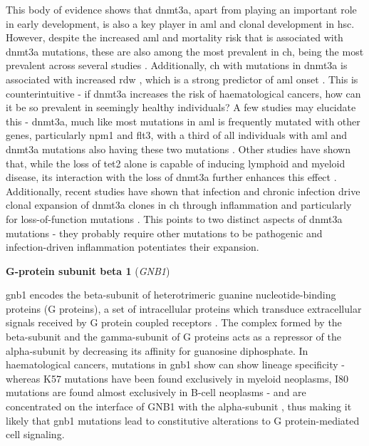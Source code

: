 This body of evidence shows that \ac{dnmt3a}, apart from playing an important role in early development, is also a key player in \ac{aml} and clonal development in \ac{hsc}. However, despite the increased \ac{aml} and mortality risk that is associated with \ac{dnmt3a} mutations, these are also among the most prevalent in \ac{ch}, being the most prevalent across several studies \cite{Jaiswal2014-rl,Genovese2014-eu,Zink2017-zi,Xie2014-np,Zehir2017-gh}. Additionally, \ac{ch} with mutations in \ac{dnmt3a} is associated with increased \ac{rdw} \cite{Dawoud2020-af}, which is a strong predictor of \ac{aml} onset \cite{Abelson2018-wh}. This is counterintuitive - if \ac{dnmt3a} increases the risk of haematological cancers, how can it be so prevalent in seemingly healthy individuals? A few studies may elucidate this - \ac{dnmt3a}, much like most mutations in \ac{aml} is frequently mutated with other genes, particularly \ac{npm1} and \ac{flt3}, with a third of all individuals with \ac{aml} and \ac{dnmt3a} mutations also having these two mutations \cite{noauthor_2013-ti,Bezerra2020-zc}. Other studies have shown that, while the loss of \ac{tet2} alone is capable of inducing lymphoid and myeloid disease, its interaction with the loss of \ac{dnmt3a} further enhances this effect \cite{Zhang2016-ys}. Additionally, recent studies have shown that infection and chronic infection drive clonal expansion of \ac{dnmt3a} clones in \ac{ch} through inflammation and particularly for loss-of-function mutations \cite{Hormaechea_Agulla2019-cd,Hormaechea-Agulla2021-kr}. This points to two distinct aspects of \ac{dnmt3a} mutations - they probably require other mutations to be pathogenic and infection-driven inflammation potentiates their expansion.

\noindent \textbf{G-protein  subunit  beta  1 } (\textit{GNB1})

\Ac{gnb1} encodes the beta-subunit of heterotrimeric guanine nucleotide-binding proteins (G proteins), a set of intracellular proteins which transduce extracellular signals received by G protein coupled receptors \cite{Hurowitz2000-nk}. The complex formed by the beta-subunit and the gamma-subunit of G proteins acts as a repressor of the alpha-subunit by decreasing its affinity for guanosine diphosphate. In haematological cancers, mutations in \ac{gnb1} show can show lineage specificity - whereas K57 mutations have been found exclusively in myeloid neoplasms, I80 mutations are found almost exclusively in B-cell neoplasms - and are concentrated on the interface of GNB1 with the alpha-subunit \cite{Yoda2015-eq}, thus making it likely that \ac{gnb1} mutations lead to constitutive alterations to G protein-mediated cell signaling. 

